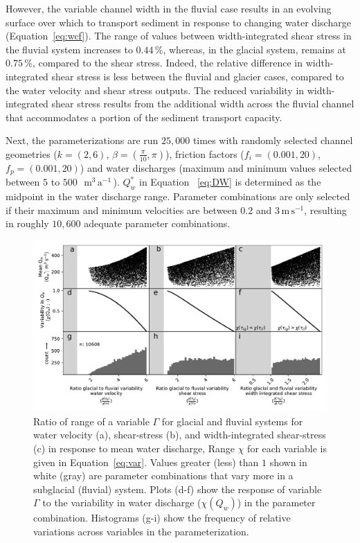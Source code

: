 \documentclass[11pt]{article}
\newcommand{\mmma}{$\,\mathrm{m^3\, a^{-1}}$\,}
\newcommand{\unit}[1]{$\mathrm{#1}$}
\begin{document}
\begin{spacing}{1}
          However, the variable channel width in the fluvial case results in an evolving surface over which to transport sediment in response to changing water discharge (Equation~\ref{eq:wcf}).
          The range of values between width-integrated shear stress in the fluvial system increases to $0.44$\,\%, whereas, in the glacial system, remains at $0.75$\,\%, compared to the shear stress.
          Indeed, the relative  difference in width-integrated shear stress is less between the fluvial and glacier cases, compared to the water velocity and shear stress outputs.
          The reduced variability in width-integrated shear stress results from the additional width across the fluvial channel that accommodates a portion of the sediment transport capacity.
        
          Next, the parameterizations are run $25,000$ times with randomly selected channel geometries ($k=(2,6)$, $\beta=(\frac{\pi}{10},\pi)$), friction factors ($f_i=(0.001,20)$, $f_p=(0.001,20)$) and water discharges (maximum and minimum values selected between $5$ to $500$ \,\mmma). $Q_w^*$ in Equation ~\ref{eq:DW} is determined as the midpoint in the water discharge range. Parameter combinations are only selected if their maximum and minimum velocities are between $0.2$ and $3$\,\unit{m}\,\unit{s}$^{-1}$, resulting in roughly $10,600$ adequate parameter combinations. 
          
          
          \begin{center}
            \begin{figure}[H]
              \includegraphics[width=0.9\linewidth]{multi_run.pdf}
              \caption{Ratio of range of a variable $\Gamma$ for glacial and fluvial systems for water velocity  (a), shear-stress (b), and  width-integrated shear-stress (c) in response to mean water discharge,
                Range  $\chi$ for each variable is given in Equation~\ref{eq:var}. Values greater (less) than $1$ shown in white (gray) are parameter combinations that vary more in a subglacial (fluvial) system. Plots (d-f) show the response of variable $\Gamma$ to the variability in water discharge ($\chi(Q_w)$) in the parameter combination. 
                Histograms (g-i) show the frequency of relative variations across variables in the parameterization.}
              \label{fig:range}
            \end{figure}
          \end{center}
        

\end{spacing}
\end{document}
